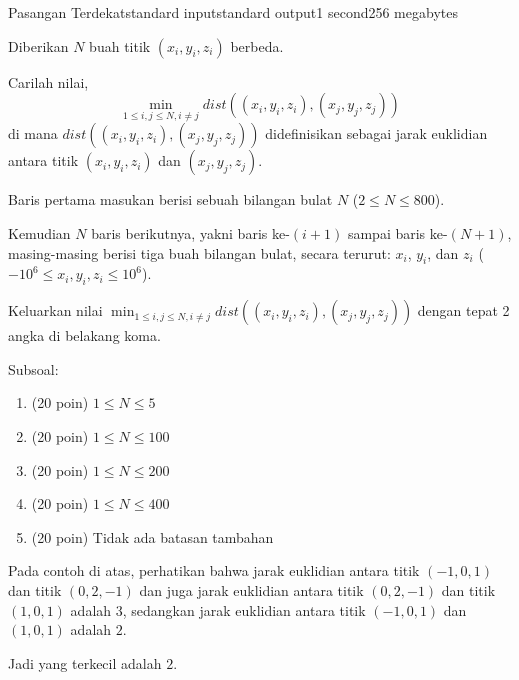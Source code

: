 \begin{problem}{Pasangan Terdekat}{standard input}{standard output}{1 second}{256 megabytes}

Diberikan $N$ buah titik $(x_i,y_i,z_i)$ berbeda.

Carilah nilai, $$\min_{1\le{i,j}\le{N},i\neq{j}}{dist((x_i,y_i,z_i),(x_j,y_j,z_j))}$$ di mana $dist((x_i,y_i,z_i),(x_j,y_j,z_j))$ didefinisikan sebagai jarak euklidian antara titik $(x_i,y_i,z_i)$ dan $(x_j,y_j,z_j)$.

\InputFile
Baris pertama masukan berisi sebuah bilangan bulat $N$ ($2\le{N}\le{800}$).

Kemudian $N$ baris berikutnya, yakni baris ke-$(i+1)$ sampai baris ke-$(N+1)$, masing-masing berisi tiga buah bilangan bulat, secara terurut: $x_i$, $y_i$, dan $z_i$ ($-10^6\le{x_i,y_i,z_i}\le{10^6}$).

\OutputFile
Keluarkan nilai $\min_{1\le{i,j}\le{N},i\neq{j}}{dist((x_i,y_i,z_i),(x_j,y_j,z_j))}$ dengan tepat 2 angka di belakang koma.

\Scoring
Subsoal:
\begin{enumerate}
    \item (20 poin) $1\le{N}\le{5}$
    \item (20 poin) $1\le{N}\le{100}$
    \item (20 poin) $1\le{N}\le{200}$
    \item (20 poin) $1\le{N}\le{400}$
    \item (20 poin) Tidak ada batasan tambahan
\end{enumerate}

\Example

\begin{example}
%
\end{example}

\Note
Pada contoh di atas, perhatikan bahwa jarak euklidian antara titik $(-1,0,1)$ dan titik $(0,2,-1)$ dan juga jarak euklidian antara titik $(0,2,-1)$ dan titik $(1,0,1)$ adalah $3$, sedangkan jarak euklidian antara titik $(-1,0,1)$ dan $(1,0,1)$ adalah $2$.

Jadi yang terkecil adalah $2$.

\end{problem}

